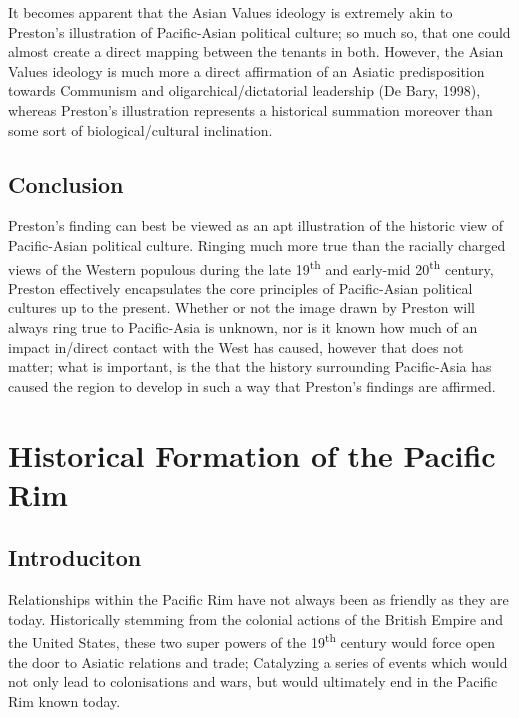 \documentclass[man,donotrepeattitle,letter]{apa6}
\begin{document}
It becomes apparent that the Asian Values ideology is extremely akin to Preston's illustration of Pacific-Asian political culture; so much so, that one could almost create a direct mapping between the tenants in both.  However, the Asian Values ideology is much more a direct affirmation of an Asiatic predisposition towards Communism and oligarchical/dictatorial leadership (De Bary, 1998), whereas Preston's illustration represents a historical summation moreover than some sort of biological/cultural inclination.

\subsection{Conclusion}
Preston's finding can best be viewed as an apt illustration of the historic view of Pacific-Asian political culture.  Ringing much more true than the racially charged views of the Western populous during the late 19\textsuperscript{th} and early-mid 20\textsuperscript{th} century, Preston effectively encapsulates the core principles of Pacific-Asian political cultures up to the present.  Whether or not the image drawn by Preston will always ring true to Pacific-Asia is unknown, nor is it known how much of an impact in/direct contact with the West has caused, however that does not matter; what is important, is the that the history surrounding Pacific-Asia has caused the region to develop in such a way that Preston's findings are affirmed.


\section{Historical Formation of the Pacific Rim}

\subsection{Introduciton}
Relationships within the Pacific Rim have not always been as friendly as they are today. Historically stemming from the colonial actions of the British Empire and the United States, these two super powers of the 19\textsuperscript{th} century would force open the door to Asiatic relations and trade; Catalyzing a series of events which would not only lead to colonisations and wars, but would ultimately end in the Pacific Rim known today.
\end{document}
